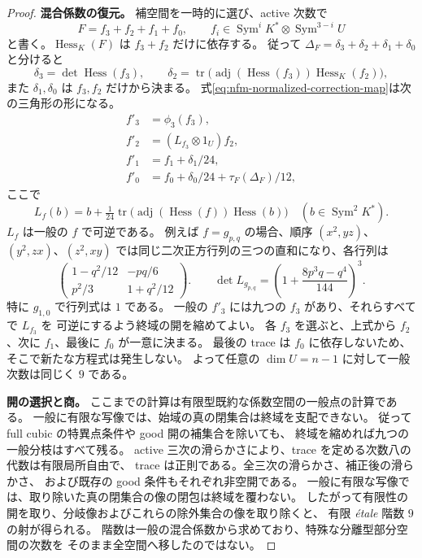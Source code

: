 \begin{proof}
\smallskip\noindent
\textbf{混合係数の復元。}
補空間を一時的に選び、active 次数で
\[
 F=f_3+f_2+f_1+f_0,\qquad
 f_i\in\operatorname{Sym}^iK^*\otimes
                    \operatorname{Sym}^{3-i}U
\]
と書く。$\operatorname{Hess}_K(F)$ は $f_3+f_2$ だけに依存する。
従って $\Delta_F=\delta_3+\delta_2+\delta_1+\delta_0$ と分けると
\[
 \delta_3=\det\operatorname{Hess}(f_3),\qquad
 \delta_2=\operatorname{tr}\bigl(
   \operatorname{adj}(\operatorname{Hess}(f_3))
                       \operatorname{Hess}_K(f_2)\bigr),
\]
また $\delta_1,\delta_0$ は $f_3,f_2$ だけから決まる。
式\eqref{eq:nfm-normalized-correction-map}は次の三角形の形になる。
\begin{align*}
 f'_3&=\phi_3(f_3),\\
 f'_2&=(L_{f_3}\otimes1_U)f_2,\\
 f'_1&=f_1+\delta_1/24,\\
 f'_0&=f_0+\delta_0/24+\tau_F(\Delta_F)/12,
\end{align*}
ここで
\[
 L_f(b)=b+\tfrac1{24}\operatorname{tr}\bigl(
   \operatorname{adj}(\operatorname{Hess}(f))\operatorname{Hess}(b)\bigr)
 \quad (b\in\operatorname{Sym}^2K^*).
\]
$L_f$ は一般の $f$ で可逆である。
例えば $f=g_{p,q}$ の場合、順序 $(x^2,yz)$、$(y^2,zx)$、$(z^2,xy)$
では同じ二次正方行列の三つの直和になり、各行列は
\[
 \begin{pmatrix}
  1-q^2/12&-pq/6\\ p^2/3&1+q^2/12
 \end{pmatrix}.
 \qquad
 \det L_{g_{p,q}}
   =\left(1+\frac{8p^3q-q^4}{144}\right)^3.
\]
特に $g_{1,0}$ で行列式は $1$ である。
一般の $f'_3$ には九つの $f_3$ があり、それらすべてで $L_{f_3}$ を
可逆にするよう終域の開を縮めてよい。
各 $f_3$ を選ぶと、上式から $f_2$、次に $f_1$、最後に $f_0$ が一意に決まる。
最後の trace は $f_0$ に依存しないため、そこで新たな方程式は発生しない。
よって任意の $\dim U=n-1$ に対して一般次数は同じく $9$ である。

\smallskip\noindent
\textbf{開の選択と商。}
ここまでの計算は有限型既約な係数空間の一般点の計算である。
一般に有限な写像では、始域の真の閉集合は終域を支配できない。
従って full cubic の特異点条件や good 開の補集合を除いても、
終域を縮めれば九つの一般分枝はすべて残る。
active 三次の滑らかさにより、trace を定める次数八の代数は有限局所自由で、
trace は正則である。全三次の滑らかさ、補正後の滑らかさ、
および既存の good 条件もそれぞれ非空開である。
一般に有限な写像では、取り除いた真の閉集合の像の閉包は終域を覆わない。
したがって有限性の開を取り、分岐像およびこれらの除外集合の像を取り除くと、
有限 \emph{\'etale} 階数 $9$ の射が得られる。
階数は一般の混合係数から求めており、特殊な分離型部分空間の次数を
そのまま全空間へ移したのではない。


\end{proof}

